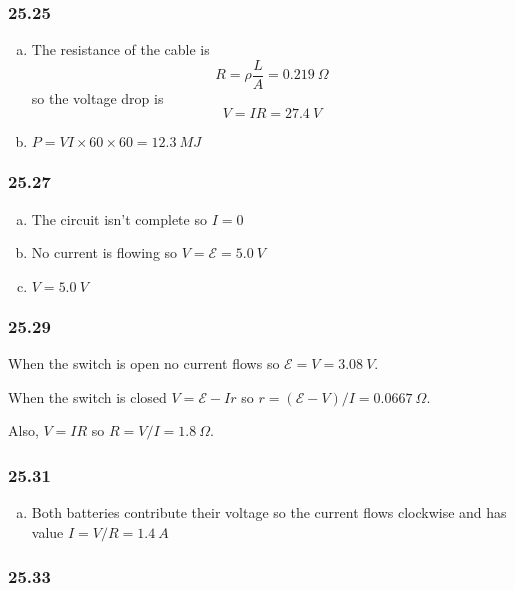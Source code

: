 \documentclass{article}
\begin{document}
\subsubsection{25.25}

\begin{enumerate}[(a)]
  \item The resistance of the cable is \[R = \rho \frac{L}{A} = \qty{0.219}{\Omega}\] so the voltage drop is \[V = I R = \qty{27.4}{V}\]

  \item $P = V I \times 60 \times 60 = \qty{12.3}{MJ}$
\end{enumerate}

\subsubsection{25.27}

\begin{enumerate}[(a)]
  \item The circuit isn't complete so $I = 0$

  \item No current is flowing so $V = \mathcal{E} = \qty{5.0}{V}$

  \item $V = \qty{5.0}{V}$
\end{enumerate}

\subsubsection{25.29}

When the switch is open no current flows so $\mathcal{E} = V = \qty{3.08}{V}$.

When the switch is closed $V = \mathcal{E} - I r$ so $r = (\mathcal{E} - V) / I = \qty{0.0667}{\Omega}$.

Also, $V = I R$ so $R = V / I = \qty{1.8}{\Omega}$.

\subsubsection{25.31}

\begin{enumerate}[(a)]
  \item Both batteries contribute their voltage so the current flows clockwise and has value $I = V / R = \qty{1.4}{A}$
\end{enumerate}

\subsubsection{25.33}
\end{document}
